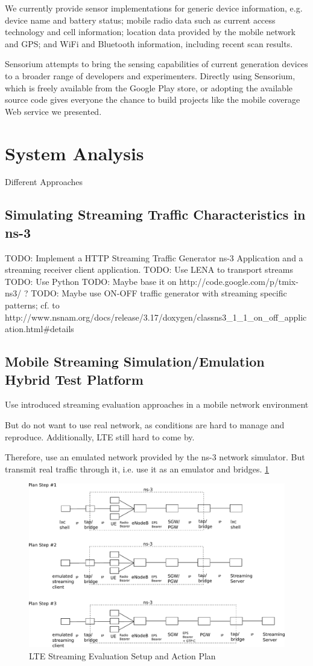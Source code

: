 We currently provide sensor implementations for generic device information, e.g. device name and battery status; mobile radio data such as current access technology and cell information; location data provided by the mobile network and GPS; and  WiFi and Bluetooth information, including recent scan results.

Sensorium attempts to bring the sensing capabilities of current generation devices to a broader range of developers and experimenters. Directly using Sensorium, which is freely available from the Google Play store, or adopting the available source code gives everyone the chance to build projects like the mobile coverage Web service we presented.


\section{System Analysis}

Different Approaches

\subsection{Simulating Streaming Traffic Characteristics in ns-3}

TODO: Implement a HTTP Streaming Traffic Generator ns-3 Application and a streaming receiver client application.
TODO: Use LENA to transport streams
TODO: Use Python
TODO: Maybe base it on http://code.google.com/p/tmix-ns3/ ?
TODO: Maybe use ON-OFF traffic generator with streaming specific patterns; cf. to http://www.nsnam.org/docs/release/3.17/doxygen/classns3\_1\_1\_on\_off\_application.html\#details


\subsection{Mobile Streaming Simulation/Emulation Hybrid Test Platform}

Use introduced streaming evaluation approaches in a mobile network environment

But do not want to use real network, as conditions are hard to manage and reproduce. Additionally, LTE still hard to come by.

Therefore, use an emulated network provided by the ns-3 network simulator. But transmit real traffic through it, i.e. use it as an emulator and bridges. \ref{fig:lte-testbed}

\begin{figure}
\centering
\includegraphics[width=\textwidth]{images/lte-testbed.pdf}
\caption{LTE Streaming Evaluation Setup and Action Plan}
\label{fig:lte-testbed}
\end{figure}